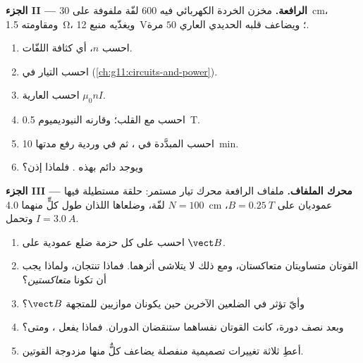 \begin{problem}
\medskip
\noindent\textbf{الجزء II --- الرافعة.}
 مخزن الخردة الكهربائي  فيه $600$ لفّة ملفوفة على
\qty{30}{cm}، ومقاومته \qty{1.5}{\ohm}، ويغذّيه منبع \qty{12}{V}؛
ويضاعف قلبه الحديدي  العاري $50$ مرة.
\begin{enumerate}[resume]
  \item احسب $n$، أي كثافة اللفّات.
  \item احسب التيار في  (\cref{ch:g11:circuits-and-power}).
  \item احسب   العارية $\mu_0 n I$.
  \item احسب  مع القلب؛ وقارنه  النيوديميوم \qty{0.5}{T}.
  \item احسب  المبدَّدة في ، ثم  في
        وردية رفع مدتها \qty{10}{\minute}.
  \item ويوجد  دائم بهذه . فلماذا  إذن؟
\end{enumerate}

\medskip
\noindent\textbf{الجزء III --- محرك الملفاف.}
ملفاف الرافعة محرك تيار مستمر: حلقة مستطيلة فيها $N = 100$ لفّة،
وضلعاها اللذان طول كلٍّ منهما \qty{4.0}{cm} عموديان على $B = \qty{0.25}{T}$،
وتحمل $I = \qty{3.0}{A}$.
\begin{enumerate}[resume]
  \item احسب  على كل حزمة ضلع عمودية على $\vect B$.
  \item القوتان متساويتان متعاكستان، ومع ذلك لا يتلاشى أثرهما.
        فماذا تنتجان، ولماذا يجب أن تكونا \emph{متعاكستين}؟
  \item وأيّ  تؤثر في الضلعين الآخرين حين يكونان موازيين للمتجهة $\vect B$؟
  \item وبعد نصف دورة، كانت القوتان نفساهما ستنقضان الدوران.
        فماذا يفعل ، ومتى؟
  \item أعطِ ثلاثة تغييرات تصميمية منفصلة يضاعف كلٌّ منها مزدوجة القوتين.
\end{enumerate}


\end{problem}
